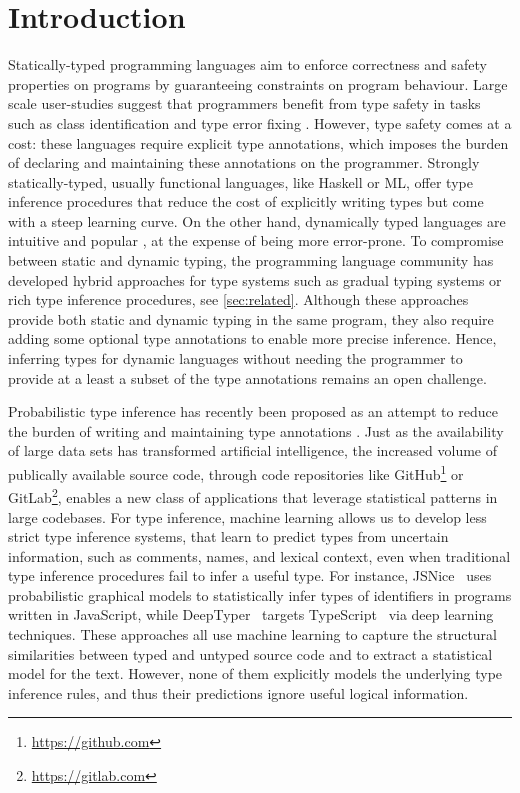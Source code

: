 \documentclass[sigplan,10pt,anonymous]{acmart} %
\theoremstyle{plain}
\theoremstyle{remark}
\theoremstyle{definition}
\begin{document}
\section{Introduction}
Statically-typed programming languages aim to enforce correctness and safety  properties
on programs by guaranteeing constraints on program behaviour.
Large scale user-studies
suggest that programmers
benefit from type safety in tasks
such as class identification and type error fixing  \citep{hanenberg14}.
However, type safety comes at a cost: these languages require explicit type annotations,
which imposes the burden of declaring and maintaining these annotations on the programmer.
Strongly statically-typed, usually functional languages, like Haskell or ML,
offer type inference procedures that reduce
the cost of explicitly writing types but come with
a steep learning curve.
On the other hand, dynamically typed languages are intuitive
and popular \cite{meyerovich12}, at the expense of being more error-prone.
To compromise between static and dynamic typing,
the programming language community has developed hybrid approaches for type systems
such as gradual typing systems \cite{siek06} or rich type inference procedures, see \cref{sec:related}.
Although these approaches provide both static and dynamic typing in the same program,
they also require adding some optional type annotations to enable more precise inference.
Hence, inferring types for dynamic
languages without needing the programmer to provide at a least a subset of
the type annotations remains an open challenge.

Probabilistic type inference
has recently been proposed as an attempt to reduce the burden
of writing and maintaining type
annotations \cite{raychev15,xu16,hellendoorn18}.
Just as the availability of large data sets has transformed artificial intelligence,
the increased volume of publically available source code, through
code repositories like GitHub\footnote{\href{https://github.com}{https://github.com}}
or GitLab\footnote{\href{https://gitlab.com}{https://gitlab.com}},
enables a new class of applications that leverage statistical
patterns in large codebases.
For type inference, machine learning
allows us to develop less strict type inference systems,
that learn to predict types from uncertain information,
such as comments, names, and lexical context,
even when traditional type inference procedures
fail to infer a useful type.
For instance,
JSNice~\cite{raychev15} uses probabilistic graphical models to statistically infer types of identifiers in programs written in JavaScript, while DeepTyper~\cite{hellendoorn18} targets TypeScript~\cite{typescript} via deep learning techniques.
These approaches all use machine learning to capture the structural
similarities between typed and untyped source code and to extract a statistical model for
the text. However, none of them explicitly models the underlying
type inference rules, and thus their predictions ignore useful logical information.
\end{document}
